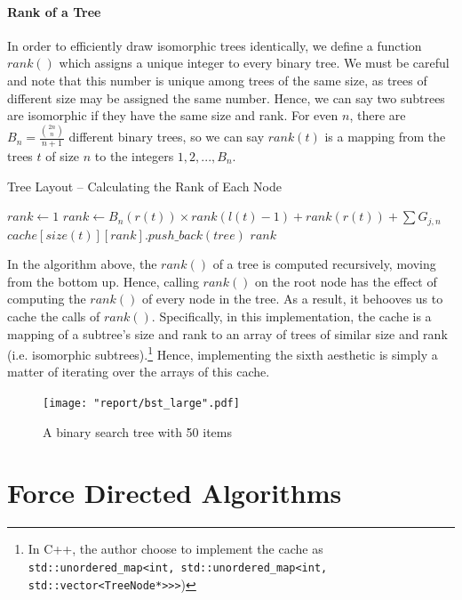 \documentclass[11pt]{report}
\begin{document}
\subsubsection{Rank of a Tree}
In order to efficiently draw isomorphic trees identically, we define a function $rank()$ which assigns a unique integer to every binary tree. We must be careful and note that this number is unique among trees of the same size, as trees of different size may be assigned the same number. Hence, we can say two subtrees are isomorphic if they have the same size and rank. For even $n$, there are $B_n = \frac{ \binom{2n}{n} }{ n + 1 }$ different binary trees, so we can say $rank(t)$ is a mapping from the trees $t$ of size $n$ to the integers $1, 2, ..., B_n$.
\begin{algorithm}[H]
    \caption{Tree Layout -- Calculating the Rank of Each Node}
    \begin{algorithmic}[1]
            \State $rank \gets 1$
        \Else
            \State $rank \gets B_n(r(t)) \times rank(l(t) - 1) + rank(r(t)) + \sum G_{j,n}$
        \EndIf
        \State $cache[size(t)][rank].push\_back(tree)$
        \State \Return $rank$
        \EndProcedure
    \end{algorithmic}
\end{algorithm}

In the algorithm above, the $rank()$ of a tree is computed recursively, moving from the bottom up. Hence, calling $rank()$ on the root node has the effect of computing the $rank()$ of every node in the tree. As a result, it behooves us to cache the calls of $rank()$. Specifically, in this implementation, the cache is a mapping of a subtree's size and rank to an array of trees of similar size and rank (i.e. isomorphic subtrees).\footnote{In C++, the author choose to implement the cache as \\ \lstinline{std::unordered_map<int, std::unordered_map<int, std::vector<TreeNode*>>>})} Hence, implementing the sixth aesthetic is simply a matter of iterating over the arrays of this cache.

\begin{figure}
    \centering
    \texttt{[image: "report/bst\_large".pdf]}
    \caption{A binary search tree with 50 items}
\end{figure}

\pagebreak

\chapter{Force Directed Algorithms}
\end{document}
